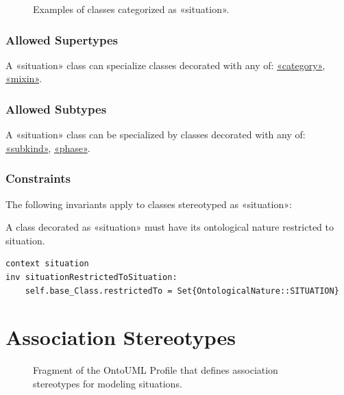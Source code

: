 \begin{figure}[h]
    \centering
    
    \caption{Examples of classes categorized as «situation».}
    \label{fig:situation-example}
\end{figure}

\subsubsection{Allowed Supertypes}

A «situation» class can specialize classes decorated with any of: 
\hyperref[stereotype:category]{«category»}, \hyperref[stereotype:mixin]{«mixin»}.

\subsubsection{Allowed Subtypes}

A «situation» class can be specialized by classes decorated with any of:
\hyperref[stereotype:subkind]{«subkind»}, \hyperref[stereotype:phase]{«phase»}.

\subsubsection{Constraints}

The following invariants apply to classes stereotyped as «situation»: 

\begin{constraint}
\label{constraint:situationRestrictedToSituation}
A class decorated as «situation» must have its ontological nature restricted to situation.
\begin{lstlisting}[language=OCL]
context situation
inv situationRestrictedToSituation:
    self.base_Class.restrictedTo = Set{OntologicalNature::SITUATION}
\end{lstlisting}
\end{constraint}
 
\section{Association Stereotypes}
\label{section:situationAssociationStereotypes}

\begin{figure}[h]
    \centering
    
    \caption{Fragment of the OntoUML Profile that defines association stereotypes for modeling situations.}
    \label{fig:situation-associations-profile}
\end{figure}

